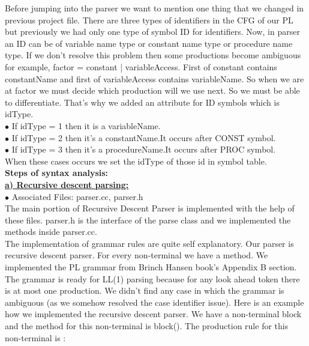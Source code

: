 \documentclass[paper=letter, fontsize=11pt]{scrartcl} %
\begin{document}
Before jumping into the parser we want to mention one thing that we changed in previous project file. There are three types of identifiers in the CFG of our PL but previously we had only one type of symbol ID for identifiers. Now, in parser an ID can be of variable name type or constant name type or procedure name type. If we don't resolve this problem then some productions become ambiguous for example, factor = constant | variableAccess. First of constant contains constantName and first of variableAccess contains variableName. So when we are at factor we must decide which production will we use next. So we must be able to differentiate. That's why we added an attribute for ID symbols which is idType.\\

$\bullet$ If idType = 1 then it is a variableName.\\ 
$\bullet$ If idType = 2	then it's a constantName.It occurs after CONST symbol.\\
$\bullet$ If idType = 3 then it's a procedureName.It occurs after PROC symbol. \\ 

When these cases occurs we set the idType of those id in symbol table.\\


{\bf Steps of syntax analysis:}\\
\underline {\bf a) Recursive descent parsing:}\\

$\bullet$ Associated Files: parser.cc, parser.h\\ 

The main portion of Recursive Descent Parser is implemented with the help of these files. parser.h is the interface of the parse class and we implemented the methods inside parser.cc.\\

The implementation of grammar rules are quite self explanatory. Our parser is recursive descent parser. For every non-terminal we have a method. We implemented the PL grammar from Brinch Hansen book's Appendix B section. The grammar is ready for LL(1) parsing because for any look ahead token there is at most one production. We didn't find any case in which the grammar is ambiguous (as we somehow resolved the case identifier issue). Here is an example how we implemented the recursive descent parser. We have a non-terminal block and the method for this non-terminal is block(). The production rule for this non-terminal is :\\
\end{document}
